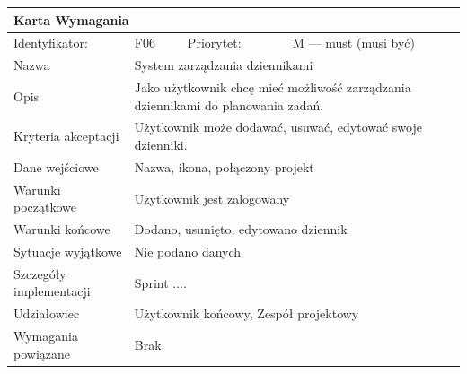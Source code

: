 \documentclass[a4paper,11pt]{report}
\begin{document}
		\begin{tabular}{|p{3cm}|p{2cm}|p{2cm}|p{6cm}|}
		\hline
		\multicolumn{4}{|p{12 cm}|}{Karta Wymagania}\\
		\hline
		Identyfikator: & F06 & Priorytet: & M — must (musi być)\\
		\hline
		Nazwa & \multicolumn{3}{|p{10 cm}|}{System zarządzania dziennikami}\\
		\hline
		Opis & \multicolumn{3}{|p{10 cm}|}{Jako użytkownik chcę mieć możliwość zarządzania dziennikami do planowania zadań.}\\
		\hline
		Kryteria akceptacji & \multicolumn{3}{|p{10 cm}|}{Użytkownik może dodawać, usuwać, edytować swoje dzienniki.}\\
		\hline
		Dane wejściowe & \multicolumn{3}{|p{10 cm}|}{Nazwa, ikona, połączony projekt}\\
		\hline
		Warunki początkowe & \multicolumn{3}{|p{10 cm}|}{Użytkownik jest zalogowany}\\
		\hline
		Warunki końcowe & \multicolumn{3}{|p{10 cm}|}{Dodano, usunięto, edytowano dziennik}\\
		\hline
		Sytuacje wyjątkowe & \multicolumn{3}{|p{10 cm}|}{Nie podano danych}\\
		\hline
		Szczegóły implementacji & \multicolumn{3}{|p{10 cm}|}{Sprint ....}\\
		\hline
		Udziałowiec & \multicolumn{3}{|p{10 cm}|}{Użytkownik końcowy, Zespół projektowy}\\
		\hline
		Wymagania powiązane & \multicolumn{3}{|p{10 cm}|}{Brak}\\
		\hline
		\end{tabular}\\
		\newline
		\vspace*{0,2 cm}
		\newline
\end{document}

